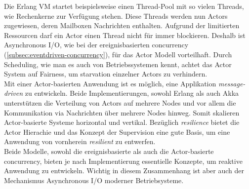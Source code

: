\pagebreak

Die Erlang VM startet beispielsweise einen Thread-Pool mit so vielen Threads, wie Rechenkerne zur Verfügung stehen. Diese Threads werden nun Actors zugewiesen, deren Mailboxen Nachrichten enthalten. Aufgrund der limitierten Ressourcen darf ein Actor einen Thread nicht für immer blockieren. Deshalb ist Asynchronous I/O, wie bei der ereignisbasierten \gls{concurrency} (\ref{subsec:eventdriven-concurrency}), für das Actor Modell vorteilhaft. Durch Scheduling, wie man es auch von Betriebssystemen kennt, achtet das Actor System auf Fairness, um \gls{starvation} einzelner Actors zu verhindern.\\

Mit einer Actor-basierten Anwendung ist es möglich, eine Applikation \textit{message-driven} zu entwickeln. Beide Implementierungen, sowohl Erlang als auch Akka unterstützen die Verteilung von Actors auf mehrere Nodes und vor allem die Kommunikation via Nachrichten über mehrere Nodes hinweg. Somit skalieren Actor-basierte Systeme horizontal und vertikal. Bezüglich \textit{resilience} bietet die Actor Hierachie und das Konzept der Supervision eine gute Basis, um eine Anwendung von vornherein \textit{resilient} zu entwerfen.\\

Beide Modelle, sowohl die ereignisbasierte als auch die Actor-basierte \gls{concurrency}, bieten je nach Implementierung essentielle Konzepte, um reaktive Anwendung zu entwickeln. Wichtig in diesem Zusammenhang ist aber auch der Mechanismus Asynchronous I/O moderner Betriebsysteme.
